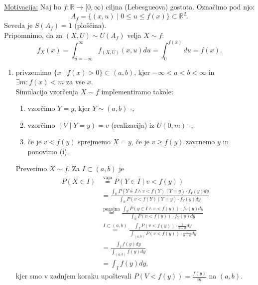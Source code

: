 \documentclass[a4paper, 12pt]{book}
\theoremstyle{definition}
\theoremstyle{remark}
\newcommand{\R}{\mathbb{R}}
\begin{document}
\underline{Motivacija:} Naj bo $f: \R \to [0, \infty)$ ciljna (Lebesgueova) gostota.
Označimo  pod njo:
\begin{equation*}
  A_f = \{(x, u) \mid 0 \leq u \leq f(x)\} \subset \R^2.
\end{equation*}
Seveda je $S(A_f) = 1$ (ploščina). \\
Pripomnimo, da za $(X,U) \sim U(A_f)$ velja $X \sim f$:
\begin{equation*}
  f_X(x) = \int_{u=-\infty}^{\infty} f_{(X,U)}(x,u) du = \int_{0}^{f(x)} du = f(x).
\end{equation*}
\begin{enumerate}[label={A/R \#\arabic{*}:}]
  \item privzemimo $\{x \mid f(x) > 0\} \subset (a,b)$, kjer $-\infty < a < b < \infty$ in $\exists m: f(x) < m$ za vse $x$. \\
    Simulacijo vzorčenja $X \sim f$ implementiramo takole:
    \begin{enumerate}[label=(\roman*)]
      \item vzorčimo $Y=y$, kjer $Y \sim (a,b)$ -,
      \item vzorčimo $(V \mid Y=y) = v$ (realizacija) iz $U(0,m)$ -,
      \item če je $v < f(y)$ sprejmemo $X=y$, če je $v \geq f(y)$ zavrnemo $y$ in ponovimo (i).
    \end{enumerate}
    Preverimo $X \sim f$. Za $I \subset (a,b)$ je
    \begin{align*}
      P(X \in I) &\stackrel{\text{vaja}}{=} P(Y \in I \mid v < f(y)) \\
      &= \frac{\int_{\R} P(Y \in I \land v < f(Y) \mid Y=y) \cdot f_Y(y) dy}
        {\int_{\R} P(v < f(Y) \mid Y=y) \cdot f_Y(y) dy} \\
      &\stackrel{\text{pogojna}}{=} \frac{\int_{\R} P(y \in I \land v < f(y)) \cdot f_Y(y) dy}
        {\int_{\R} P(v < f(y)) \cdot f_Y(y) dy} \\
      &\stackrel{I \subset (a,b)}{=} \frac{\int_{I} P(v < f(y)) \cdot \frac{1}{b-a} dy}
        {\int_{(a,b)} P(v < f(y)) \cdot \frac{1}{b-a} dy} \\
      &= \frac{\int_{I} f(y) dy}
        {\int_{(a,b)} f(y) dy} \\
      &= \int_I f(y) dy,
    \end{align*}
    kjer smo v zadnjem koraku upoštevali $P(V < f(y)) = \frac{f(y)}{m}$ na $(a,b)$. \\ %

\end{enumerate}
\end{document}
